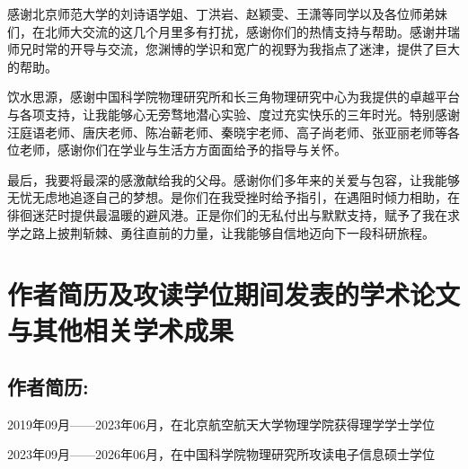 感谢北京师范大学的刘诗语学姐、丁洪岩、赵颖雯、王潇等同学以及各位师弟妹们，在北师大交流的这几个月里多有打扰，感谢你们的热情支持与帮助。感谢井瑞师兄时常的开导与交流，您渊博的学识和宽广的视野为我指点了迷津，提供了巨大的帮助。

饮水思源，感谢中国科学院物理研究所和长三角物理研究中心为我提供的卓越平台与各项支持，让我能够心无旁骛地潜心实验、度过充实快乐的三年时光。特别感谢汪庭语老师、唐庆老师、陈冶蕲老师、秦晓宇老师、高子尚老师、张亚丽老师等各位老师，感谢你们在学业与生活方方面面给予的指导与关怀。

最后，我要将最深的感激献给我的父母。感谢你们多年来的关爱与包容，让我能够无忧无虑地追逐自己的梦想。是你们在我受挫时给予指引，在遇阻时倾力相助，在徘徊迷茫时提供最温暖的避风港。正是你们的无私付出与默默支持，赋予了我在求学之路上披荆斩棘、勇往直前的力量，让我能够自信地迈向下一段科研旅程。




\chapter{作者简历及攻读学位期间发表的学术论文与其他相关学术成果}

\section*{作者简历:}
2019年09月——2023年06月，在北京航空航天大学物理学院获得理学学士学位

2023年09月——2026年06月，在中国科学院物理研究所攻读电子信息硕士学位


